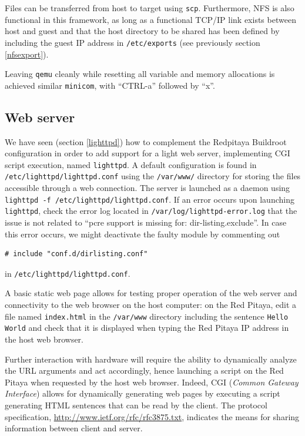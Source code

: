 \documentclass{article}
\begin{document}
{Files can be transferred from host to target using {\tt scp}. Furthermore, NFS is also functional
in this framework, as long as a functional TCP/IP link exists between host and guest and that
the host directory to be shared has been defined by including the guest IP address in
{\tt /etc/exports} (see previously section \ref{nfsexport}).

Leaving {\tt qemu} cleanly while resetting all variable and memory allocations is achieved
similar {\tt minicom}, with ``CTRL-a'' followed by ``x''.
 
\subsection{Web server}\label{boa}

We have seen (section \ref{lighttpd}) how to complement the Redpitaya Buildroot configuration in order
to add support for a light web server, implementing CGI script execution, named
{\tt lighttpd}. A default configuration is found in {\tt /etc/lighttpd/lighttpd.conf} 
using the {\tt /var/www/} directory for storing the files accessible through a web
connection. The server is launched as a daemon using 
{\tt lighttpd -f /etc/lighttpd/lighttpd.conf}.
If an error occurs upon launching {\tt lighttpd}, check the error log located in
{\tt /var/log/lighttpd-error.log} that the issue is not related to
``pcre support is missing for: dir-listing.exclude''. In case this error occurs, we 
might deactivate the faulty module by commenting out
\begin{verbatim}
# include "conf.d/dirlisting.conf"
\end{verbatim}
in {\tt /etc/lighttpd/lighttpd.conf}.

A basic static web page allows for testing proper operation of the web server and connectivity
to the web browser on the host computer: on the Red Pitaya, edit a file named {\tt index.html}
in the {\tt /var/www} directory including the sentence {\tt Hello World} and check that it
is displayed when typing the Red Pitaya IP address in the host web browser.

Further interaction with hardware will require the ability to dynamically analyze the URL arguments
and act accordingly, hence launching a script on the Red Pitaya when requested by the host web browser.
Indeed, CGI ({\em Common Gateway Interface}) allows for dynamically generating web pages
by executing a script generating HTML sentences that can be read by the client. The protocol
specification, \url{http://www.ietf.org/rfc/rfc3875.txt}, indicates the means for sharing information
between client and server.

}
\end{document}
